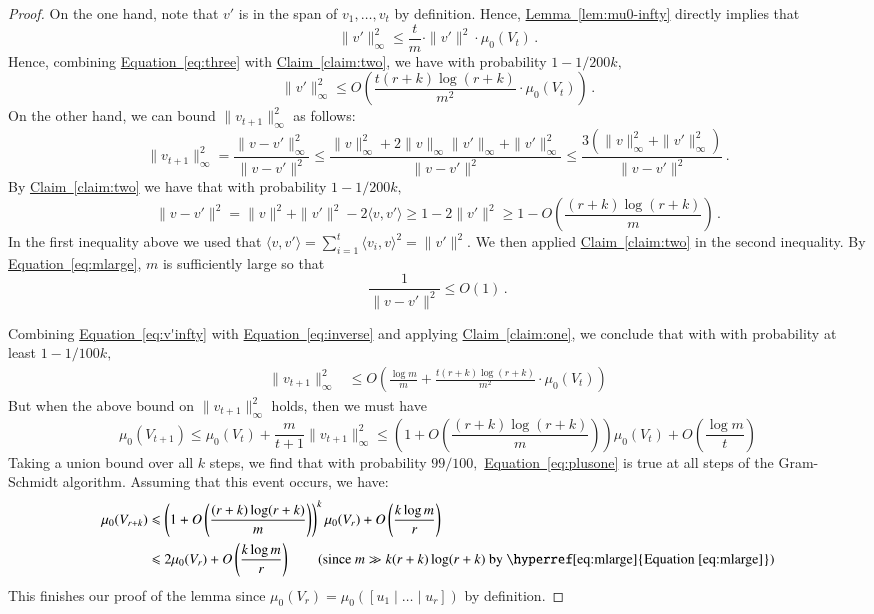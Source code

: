 \documentclass[letterpaper,11pt]{article}
\theoremstyle{definition}
\newcommand{\claimref}[1]{\hyperref[claim:#1]{Claim~\ref{claim:#1}}}
\newcommand{\equationlabel}[1]{\label{eq:#1}}
\newcommand{\equationref}[1]{\hyperref[eq:#1]{Equation~\ref{eq:#1}}}
\newcommand{\lemmaref}[1]{\hyperref[lem:#1]{Lemma~\ref{lem:#1}}}
\newcommand{\mper}{\,.}
\renewcommand{\le}{\leqslant}
\renewcommand{\ge}{\geqslant}
\begin{document}
\begin{proof}
On the one hand, note
that $v'$ is in the span of $v_1,\dots,v_t$ by definition. Hence,
\lemmaref{mu0-infty} directly implies
that
\begin{equation}
\equationlabel{three}
\|v'\|_\infty^2 \le\frac{t}{m}\cdot\|v'\|^2\cdot\mu_0(V_t)\mper
\end{equation}
Hence, combining \equationref{three} with \claimref{two},
we have with probability $1-1/200k,$
\begin{equation}\equationlabel{v'infty}
\|v'\|_\infty^2
\le O\left(\frac{t(r+k)\log(r+k)}{m^2}\cdot\mu_0(V_t)\right)\mper
\end{equation}
On the other hand, we can bound $\|v_{t+1}\|_\infty^2$ as follows:
\[
\|v_{t+1}\|_\infty^2
= \frac{\|v-v'\|_\infty^2} {\|v-v'\|^2}
\le \frac{\|v\|_\infty^2+2\|v\|_\infty\|v'\|_\infty+\|v'\|_\infty^2} {\|v-v'\|^2}
\le \frac{3(\|v\|_\infty^2+\|v'\|_\infty^2)} {\|v-v'\|^2}
\mper
\]
By \claimref{two} we have that with probability $1-1/200k,$
\[
\|v-v'\|^2=\|v\|^2+\|v'\|^2-2\langle v,v'\rangle
\ge 1 - 2\|v'\|^2
\ge 1 - O\left(\frac{(r+k)\log(r+k)}m\right)\mper
\]
In the first inequality above we used that $\langle v,v'\rangle = \sum_{i=1}^t \langle
v_i,v\rangle^2=\|v'\|^2.$
We then applied \claimref{two} in the second inequality.
By \equationref{mlarge}, $m$ is sufficiently large so that
\begin{equation}\equationlabel{inverse}
\frac1{\|v-v'\|^2} \le O(1)\mper
\end{equation}

Combining \equationref{v'infty} with \equationref{inverse} and applying
\claimref{one}, we conclude that with
with probability at least $1-1/100k,$
\begin{align*}
\|v_{t+1}\|_\infty^2
&
\le
O \left(\frac{\log m}m +
\frac{t(r+k)\log(r+k)}{m^2}\cdot\mu_0(V_t)
\right) \end{align*}
But when the above bound on $\|v_{t+1}\|_\infty^2$ holds, then we must
have
\begin{equation}\equationlabel{plusone}
\mu_0(V_{t+1})
\le \mu_0(V_t) + \frac m{t+1}\|v_{t+1}\|_\infty^2
\le \left(1+ O\left(\frac{(r+k)\log(r+k)}{m}\right) \right) \mu_0(V_t) +
O \left(\frac{\log m}{t}\right)
\end{equation}
Taking a union bound over all $k$ steps, we find that with probability
$99/100,$ \equationref{plusone} is true at all steps of the Gram-Schmidt
algorithm. Assuming that this event occurs, we have:
\begin{align*}
\mu_0(V_{r+k})
& \le \left(1+ O\left(\frac{(r+k)\log(r+k)}{m}\right) \right)^k \mu_0(V_r) +
O \left(\frac{k\log m}{r}\right)  \\
& \le 2\mu_0(V_r) + O\left(
\frac{k\log m}{r}\right)
\tag{since $m\gg k(r+k)\log(r+k)$ by \equationref{mlarge}}
\end{align*}
This finishes our proof of the lemma since $\mu_0(V_r)=\mu_0([u_1\mid\dots\mid u_r])$ by
definition.
\end{proof}
\end{document}
